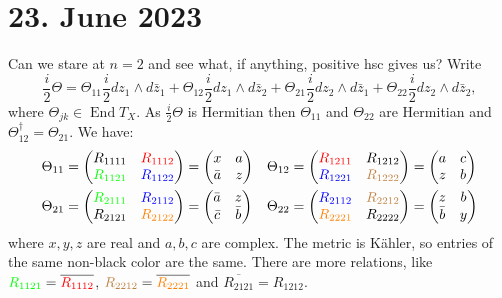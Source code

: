 \documentclass[11pt]{amsart}
\theoremstyle{definition}
\def\ov#1{\overline{#1}}
\DeclareMathOperator{\End}{End}
\begin{document}
\section{23. June 2023}

Can we stare at $n = 2$ and see what, if anything, positive hsc gives us?
Write
$$
\frac i2 \Theta
= \Theta_{11} \frac i2 dz_1 \wedge d\bar z_1
+ \Theta_{12} \frac i2 dz_1 \wedge d\bar z_2
+ \Theta_{21} \frac i2 dz_2 \wedge d\bar z_1
+ \Theta_{22} \frac i2 dz_2 \wedge d\bar z_2,
$$
where $\Theta_{jk} \in \End T_X$.
As $\frac i2 \Theta$ is Hermitian then $\Theta_{11}$ and $\Theta_{22}$ are
Hermitian and $\Theta_{12}^\dagger = \Theta_{21}$.
We have:
\begin{align*}
\Theta_{11} &=
\begin{pmatrix}
R_{1111} & \color{red}{{R_{1112}}}
\\
\color{green}{R_{1121}} & \color{blue}{R_{1122}}
\end{pmatrix}
= \begin{pmatrix}
x & a
\\
\bar a & z
\end{pmatrix}
	    &
\Theta_{12} &=
\begin{pmatrix}
\color{red}{{R_{1211}}} & R_{1212}
\\
\color{blue}{R_{1221}} & \color{brown}{R_{1222}}
\end{pmatrix}
= \begin{pmatrix}
a & c
\\
z & b
\end{pmatrix}
\\
\Theta_{21} &=
\begin{pmatrix}
\color{green}{R_{2111}} & \color{blue}{R_{2112}}
\\
R_{2121} & \color{orange}{R_{2122}}
\end{pmatrix}
= \begin{pmatrix}
\bar a & z
\\
\bar c & \bar b
\end{pmatrix}
	    &
\Theta_{22} &=
\begin{pmatrix}
\color{blue}{R_{2112}} & \color{brown}{R_{2212}}
\\
\color{orange}{R_{2221}} & R_{2222}
\end{pmatrix}
= \begin{pmatrix}
z & b
\\
\bar b & y
\end{pmatrix}
\end{align*}
where $x,y,z$ are real and $a, b, c$ are complex.
The metric is K\"ahler, so entries of the same non-black color are the same.
There are more relations, like ${\color{green} R_{1121}} =
\ov{\color{red}{R_{1112}}}$,
${\color{brown} R_{2212}} = \ov{\color{orange} R_{2221}}$
and $\ov{R_{2121}} = R_{1212}$.
\end{document}
